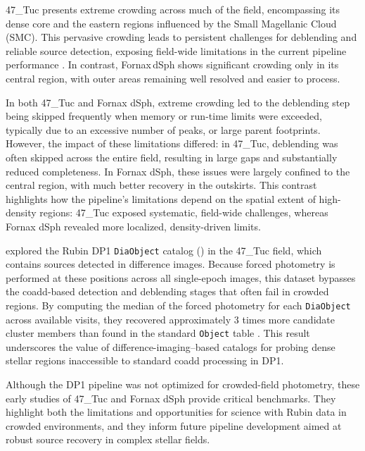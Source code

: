 47\_Tuc presents extreme crowding across much of the field, encompassing its dense core and the eastern regions influenced by the Small Magellanic Cloud (SMC).
This pervasive crowding leads to persistent challenges for deblending and reliable source detection, exposing field-wide limitations in the current pipeline performance \citep[][]{Choi_2025}.
In contrast, Fornax\,dSph shows significant crowding only in its central region, with outer areas remaining well resolved and easier to process.

In both 47\_Tuc and Fornax dSph, extreme crowding led to the deblending step being skipped frequently when memory or run-time limits were exceeded, typically due to an excessive number of peaks, or large parent footprints.
However, the impact of these limitations differed: in 47\_Tuc, deblending was often skipped across the entire field, resulting in large gaps and substantially reduced completeness.
In Fornax dSph, these issues were largely confined to the central region, with much better recovery in the outskirts.
This contrast highlights how the pipeline’s limitations depend on the spatial extent of high-density regions: 47\_Tuc exposed systematic, field-wide challenges, whereas Fornax dSph revealed more localized, density-driven limits.

\citep[][]{2025RNAAS...9..171W} explored the Rubin \gls{DP1} \texttt{DiaObject} catalog () in the 47\_Tuc field, which contains sources detected in difference images.
Because forced photometry is performed at these positions across all single-epoch images, this dataset bypasses the coadd-based detection and deblending stages that often fail in crowded regions.
By computing the median of the forced photometry for each  \texttt{DiaObject} across available visits, they recovered approximately 3 times more candidate cluster members than found in the standard \texttt{Object} table \citep[][]{Choi_2025}.
This result underscores the value of difference-imaging–based catalogs for probing dense stellar regions inaccessible to standard coadd processing in \gls{DP1}.

Although the \gls{DP1} pipeline was not optimized for crowded-field photometry, these early studies of 47\_Tuc and Fornax dSph provide critical benchmarks.
They highlight both the limitations and opportunities for science with Rubin data in crowded environments, and they inform future pipeline development aimed at robust source recovery in complex stellar fields.
